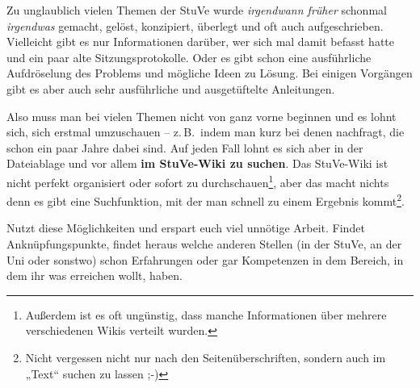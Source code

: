 



%
%
%


\null
\clearpage
\null
\vfill
Zu unglaublich vielen Themen der StuVe wurde \textit{irgendwann früher}{\textsuperscript\texttrademark} schonmal \textit{irgendwas}{\textsuperscript\textcopyright} gemacht, gelöst, konzipiert, überlegt und oft auch aufgeschrieben. Vielleicht gibt es nur Informationen darüber, wer sich mal damit befasst hatte und ein paar alte Sitzungsprotokolle. Oder es gibt schon eine ausführliche Aufdröselung des Problems und mögliche Ideen zu Lösung. Bei einigen Vorgängen gibt es aber auch sehr ausführliche und ausgetüftelte Anleitungen.

Also muss man bei vielen Themen nicht von ganz vorne beginnen und es lohnt sich, sich erstmal umzuschauen -- z.\,B.~indem man kurz bei denen nachfragt, die schon ein paar Jahre dabei sind. Auf jeden Fall lohnt es sich aber in der Dateiablage und vor allem \textbf{im StuVe-Wiki zu suchen}. Das StuVe-Wiki ist nicht perfekt organisiert oder sofort zu durchschauen\footnote{Außerdem ist es oft ungünstig, dass  manche Informationen über mehrere verschiedenen Wikis verteilt wurden.}, aber das macht nichts denn es gibt eine Suchfunktion, mit der man schnell zu einem Ergebnis kommt\footnote{Nicht vergessen nicht nur nach den Seitenüberschriften, sondern auch im „Text“ suchen zu lassen ;-)}.

Nutzt diese Möglichkeiten und erspart euch viel unnötige Arbeit. Findet Anknüpfungspunkte, findet heraus welche anderen Stellen (in der StuVe, an der Uni oder sonstwo) schon Erfahrungen oder gar Kompetenzen in dem Bereich, in dem ihr was erreichen wollt, haben.
\vfill
\vfill


